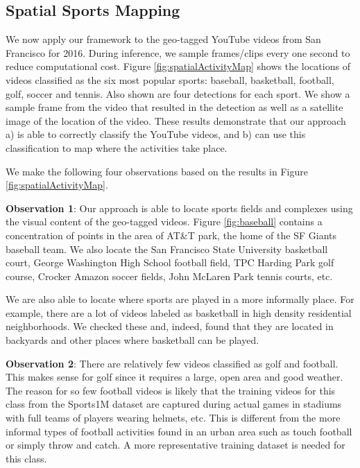 \documentclass[sigconf]{acmart}
\begin{document}
	\subsection{Spatial Sports Mapping}
	\label{sec:spatial_sports_mapping}
	We now apply our framework to the geo-tagged YouTube videos from San Francisco for 2016. During inference, we sample frames/clips every one second to reduce computational cost.
	Figure \ref{fig:spatialActivityMap} shows the locations of videos classified as the six most popular sports: baseball, basketball, football, golf, soccer and tennis. Also shown are four detections for each sport. We show a sample frame from the video that resulted in the detection as well as a satellite image of the location of the video. These results demonstrate that our approach a) is able to correctly classify the YouTube videos, and b) can use this classification to map where the activities take place.
	
	We make the following four observations based on the results in Figure \ref{fig:spatialActivityMap}.
	
	\noindent \textbf{Observation 1}: Our approach is able to locate sports fields and complexes using the visual content of the geo-tagged videos. Figure \ref{fig:baseball} contains a concentration of points in the area of AT$\&$T park, the home of the SF Giants baseball team. We also locate the San Francisco State University basketball court, George Washington High School football field, TPC Harding Park golf course, Crocker Amazon soccer fields, John McLaren Park tennis courts, etc. 
	
	We are also able to locate where sports are played in a more informally place. For example, there are a lot of videos labeled as basketball in high density residential neighborhoods. We checked these and, indeed, found that they are located in backyards and other places where basketball can be played.
	
	
	\noindent \textbf{Observation 2}: There are relatively few videos classified as golf and football. This makes sense for golf since it requires a large, open area and good weather. The reason for so few football videos is likely that the training videos for this class from the Sports1M dataset are captured during actual games in stadiums with full teams of players wearing helmets, etc. This is different from the more informal types of football activities found in an urban area such as touch football or simply throw and catch. A more representative training dataset is needed for this class.
	
\end{document}
